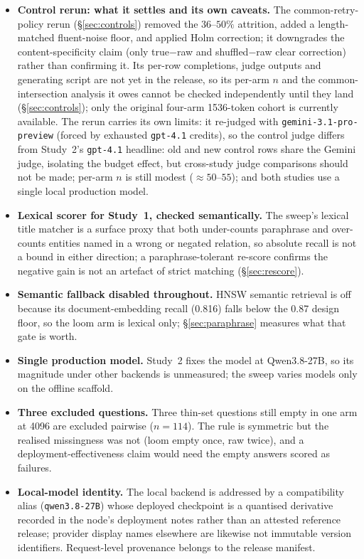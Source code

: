 \documentclass[10pt,twocolumn]{article}
\begin{document}
\begin{itemize}[topsep=2pt,itemsep=2pt,leftmargin=1.4em]
\item \textbf{Control rerun: what it settles and its own caveats.} The common-retry-policy rerun (\S\ref{sec:controls}) removed the $36$--$50\%$ attrition, added a length-matched fluent-noise floor, and applied Holm correction; it downgrades the content-specificity claim (only true$-$raw and shuffled$-$raw clear correction) rather than confirming it. Its per-row completions, judge outputs and generating script are not yet in the release, so its per-arm $n$ and the common-intersection analysis it owes cannot be checked independently until they land (\S\ref{sec:controls}); only the original four-arm 1536-token cohort is currently available. The rerun carries its own limits: it re-judged with \texttt{gemini-3.1-pro-preview} (forced by exhausted \texttt{gpt-4.1} credits), so the control judge differs from Study~2's \texttt{gpt-4.1} headline: old and new control rows share the Gemini judge, isolating the budget effect, but cross-study judge comparisons should not be made; per-arm $n$ is still modest ($\approx50$--$55$); and both studies use a single local production model.
\item \textbf{Lexical scorer for Study~1, checked semantically.} The sweep's lexical title matcher is a surface proxy that both under-counts paraphrase and over-counts entities named in a wrong or negated relation, so absolute recall is not a bound in either direction; a paraphrase-tolerant re-score confirms the negative gain is not an artefact of strict matching (\S\ref{sec:rescore}).
\item \textbf{Semantic fallback disabled throughout.} HNSW semantic retrieval is off because its document-embedding recall (0.816) falls below the 0.87 design floor, so the loom arm is lexical only; \S\ref{sec:paraphrase} measures what that gate is worth.
\item \textbf{Single production model.} Study~2 fixes the model at Qwen3.8-27B, so its magnitude under other backends is unmeasured; the sweep varies models only on the offline scaffold.
\item \textbf{Three excluded questions.} Three thin-set questions still empty in one arm at 4096 are excluded pairwise ($n=114$). The rule is symmetric but the realised missingness was not (loom empty once, raw twice), and a deployment-effectiveness claim would need the empty answers scored as failures.
\item \textbf{Local-model identity.} The local backend is addressed by a compatibility alias (\texttt{qwen3.8-27B}) whose deployed checkpoint is a quantised derivative recorded in the node's deployment notes rather than an attested reference release; provider display names elsewhere are likewise not immutable version identifiers. Request-level provenance belongs to the release manifest.

\end{itemize}
\end{document}
